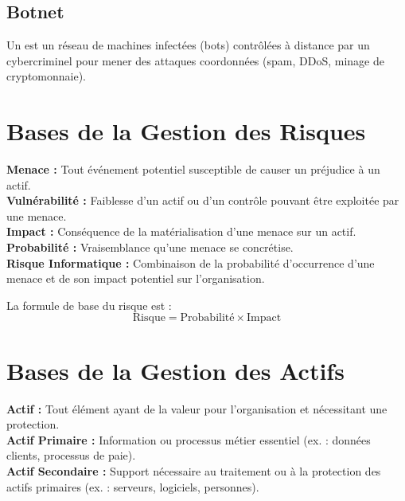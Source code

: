 \subsection{Botnet}
Un  est un réseau de machines infectées (bots) contrôlées à distance par un cybercriminel pour mener des attaques coordonnées (spam, DDoS, minage de cryptomonnaie).

\section{Bases de la Gestion des Risques}

\begin{boxdef}
\textbf{Menace :} Tout événement potentiel susceptible de causer un préjudice à un actif.\\[0.3em]
\textbf{Vulnérabilité :} Faiblesse d'un actif ou d'un contrôle pouvant être exploitée par une menace.\\[0.3em]
\textbf{Impact :} Conséquence de la matérialisation d'une menace sur un actif.\\[0.3em]
\textbf{Probabilité :} Vraisemblance qu'une menace se concrétise.\\[0.3em]
\textbf{Risque Informatique :} Combinaison de la probabilité d'occurrence d'une menace et de son impact potentiel sur l'organisation.
\end{boxdef}

La formule de base du risque est :
\[
\text{Risque} = \text{Probabilité} \times \text{Impact}
\]

\section{Bases de la Gestion des Actifs}

\begin{boxdef}
\textbf{Actif :} Tout élément ayant de la valeur pour l'organisation et nécessitant une protection.\\[0.3em]
\textbf{Actif Primaire :} Information ou processus métier essentiel (ex. : données clients, processus de paie).\\[0.3em]
\textbf{Actif Secondaire :} Support nécessaire au traitement ou à la protection des actifs primaires (ex. : serveurs, logiciels, personnes).
\end{boxdef}

